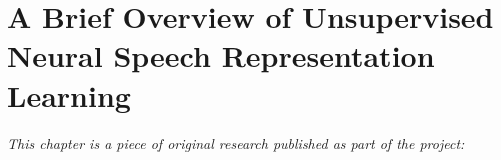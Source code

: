 
\chapter[a brief overview of unsupervised neural speech representation learning]{A Brief Overview of Unsupervised Neural Speech Representation Learning}
\label{chp:paper-brief}

\textit{This chapter is a piece of original research published as part of the project:} \newline
\begin{center}
    \begin{enumerate}[leftmargin=8mm,rightmargin=8mm,topsep=0mm,label={[\Alph*]}]
        \setcounter{enumi}{2}
        \item {} \co \parencite{borgholt_brief_2022}
        \end{enumerate}
\end{center}

